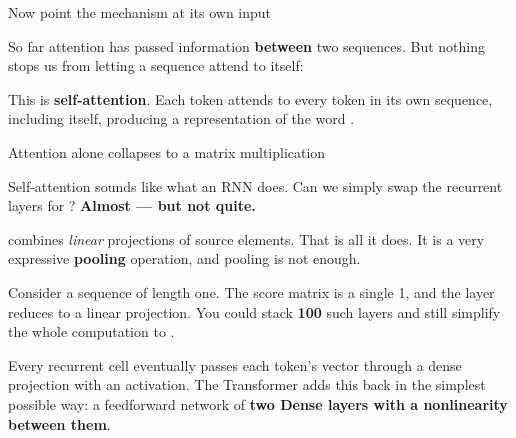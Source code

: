 \documentclass[aspectratio=169,11pt,t]{beamer}
\begin{document}
\begin{frame}[shrink=25]{Now point the mechanism at its own input}
{\fontsize{9.4}{12.6}\selectfont\color{fg2}So far attention has passed information \textbf{between} two sequences. But nothing stops us from letting a sequence attend to itself:\par}\vskip 4pt
{\fontsize{9.4}{12.6}\selectfont\color{fg2}This is \textbf{self-attention}. Each token attends to every token in its own sequence, including itself, producing a representation of the word .\par}\vskip 4pt
\begin{iquote}
\end{iquote}
\end{frame}

\begin{frame}[shrink=25]{Attention alone collapses to a matrix multiplication}
{\fontsize{9.4}{12.6}\selectfont\color{fg2}Self-attention sounds like what an RNN does. Can we simply swap the recurrent layers for ? \textbf{Almost --- but not quite.}\par}\vskip 4pt
{\fontsize{9.4}{12.6}\selectfont\color{fg2} combines \textit{linear} projections of source elements. That is all it does. It is a very expressive \textbf{pooling} operation, and pooling is not enough.\par}\vskip 4pt
\begin{iband}[rose]
Consider a sequence of length one. The score matrix is a single 1, and the layer reduces to a linear projection. You could stack \textbf{100} such layers and still simplify the whole computation to .
\end{iband}
{\fontsize{9.4}{12.6}\selectfont\color{fg2}Every recurrent cell eventually passes each token's vector through a dense projection with an activation. The Transformer adds this back in the simplest possible way: a feedforward network of \textbf{two Dense layers with a nonlinearity between them}.\par}\vskip 4pt
\end{frame}
\end{document}

